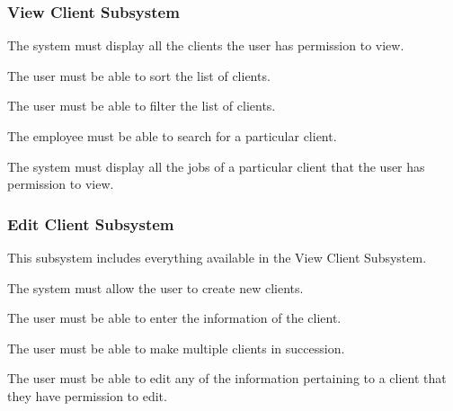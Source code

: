 \documentclass{article}
\begin{document}
	\subsubsection*{View Client Subsystem}	
	\begin{list}{R.}{}
		\item The system must display all the clients the user has permission to view.
		\begin{list}{R.}{}
			\item The user must be able to sort the list of clients.
			\item The user must be able to filter the list of clients.
			\item The employee must be able to search for a particular client.
		\end{list}
		\item The system must display all the jobs of a particular client that the user has permission to view.
	\end{list}
	\subsubsection*{Edit Client Subsystem}	
	\begin{list}{R.}{}
		\item This subsystem includes everything available in the View Client Subsystem.
		\item The system must allow the user to create new clients.
		\begin{list}{R.}{}
			\item The user must be able to enter the information of the client.
			\item The user must be able to make multiple clients in succession.
		\end{list}
		\item The user must be able to edit any of the information pertaining to a client that they have permission to edit.
	\end{list}
	
	
\end{document}
